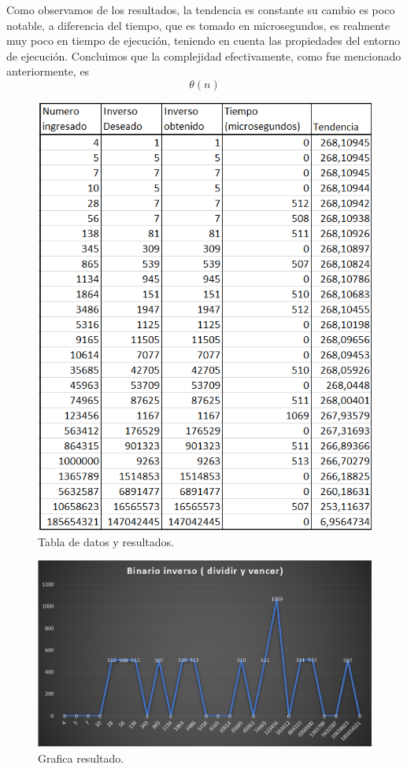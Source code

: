\documentclass[letter]{article}
\begin{document}
Como observamos de los resultados, la tendencia es constante su cambio es poco notable, a diferencia del tiempo, que es tomado en microsegundos, es realmente muy poco en tiempo de ejecución, teniendo en cuenta las propiedades del entorno de ejecución. Concluimos que la complejidad efectivamente, como fue mencionado anteriormente, es \[\theta(n)\]
\begin{figure}[h]
\centerline{\includegraphics[scale=1]{images/Tabla de datos.PNG}}
\caption{Tabla de datos y resultados.}
\label{table}
\end{figure}


\begin{figure}[h]
\centerline{\includegraphics[scale=1]{images/Grafica.PNG}}
\caption{Grafica resultado.}
\label{graph}
\end{figure}
\end{document}

